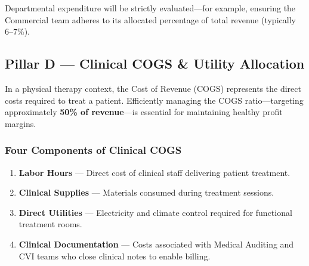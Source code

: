 \documentclass[11pt,a4paper]{article}
\begin{document}
\begin{center}
\end{center}

Departmental expenditure will be strictly evaluated---for example, ensuring the Commercial
team adheres to its allocated percentage of total revenue (typically 6--7\%).


\subsection{Pillar D --- Clinical COGS \& Utility Allocation}

In a physical therapy context, the Cost of Revenue (COGS) represents the direct costs
required to treat a patient. Efficiently managing the COGS ratio---targeting approximately
\textbf{50\% of revenue}---is essential for maintaining healthy profit margins.

\subsubsection{Four Components of Clinical COGS}

\begin{enumerate}
  \item \textbf{Labor Hours} --- Direct cost of clinical staff delivering patient treatment.
  \item \textbf{Clinical Supplies} --- Materials consumed during treatment sessions.
  \item \textbf{Direct Utilities} --- Electricity and climate control required for functional
        treatment rooms.
  \item \textbf{Clinical Documentation} --- Costs associated with Medical Auditing and CVI
        teams who close clinical notes to enable billing.
\end{enumerate}
\end{document}
